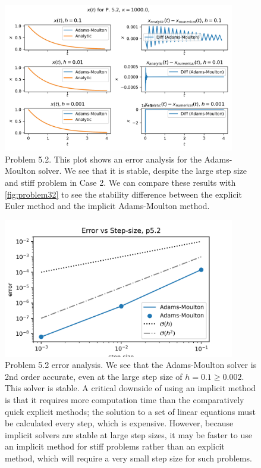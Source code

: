 \documentclass[10pt,letterpaper,notitlepage]{article}
\begin{document}
    \begin{figure}[h]
        \centering
        \includegraphics[width=0.9\textwidth]{../figures/p52.png}
        \caption{Problem 5.2. This plot shows an error analysis for the Adams-Moulton solver. We see that it is stable, despite the large step size and stiff problem in Case 2. We can compare these results with \cref{fig:problem32} to see the stability difference between the explicit Euler method and the implicit Adams-Moulton method.}
        \label{fig:problem52}
    \end{figure}
    \begin{figure}[h]
        \centering
        \includegraphics[width=0.9\textwidth]{../figures/p52err.png}
        \caption{Problem 5.2 error analysis. We see that the Adams-Moulton solver is 2nd order accurate, even at the large step size of $h = 0.1 \geq 0.002$. This solver is stable. A critical downside of using an implicit method is that it requires more computation time than the comparatively quick explicit methods; the solution to a set of linear equations must be calculated every step, which is expensive. However, because implicit solvers are stable at large step sizes, it may be faster to use an implicit method for stiff problems rather than an explicit method, which will require a very small step size for such problems.}
        \label{fig:problem52err}
    \end{figure}
\end{document}
